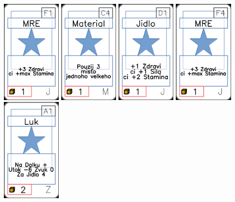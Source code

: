 \documentclass[a4paper]{article}
\begin{document}
	\includegraphics[width=3.0cm]{img-1_25}
	\includegraphics[width=3.0cm]{img-1_43}
	\includegraphics[width=3.0cm]{img-1_15}
	\includegraphics[width=3.0cm]{img-1_28}
	\includegraphics[width=3.0cm]{img-1_90}
\end{document}
